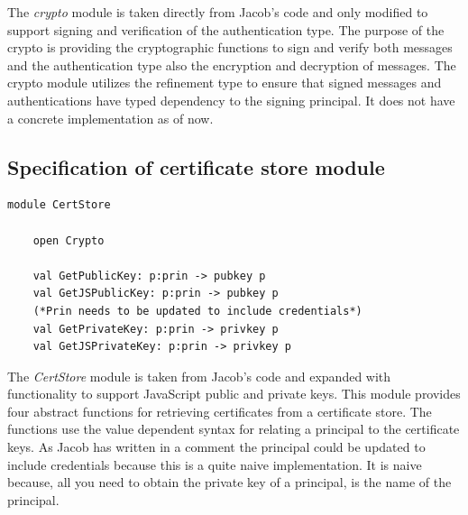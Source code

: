 \documentclass[twosided]{report}
\begin{document}
The \emph{crypto} module is taken directly from Jacob's code and only modified to support signing and verification of the authentication type. The purpose of the crypto is providing the cryptographic functions to sign and verify both messages and the authentication type also the encryption and decryption of messages. The crypto module utilizes the refinement type to ensure that signed messages and authentications have typed dependency to the signing principal. It does not have a concrete implementation as of now.
\subsection{Specification of certificate store module}

\begin{lstlisting}[style=fstar, caption={Abstract certificate store}]
	module CertStore
	
	open Crypto

	val GetPublicKey: p:prin -> pubkey p
	val GetJSPublicKey: p:prin -> pubkey p
	(*Prin needs to be updated to include credentials*)
	val GetPrivateKey: p:prin -> privkey p 
	val GetJSPrivateKey: p:prin -> privkey p
\end{lstlisting}

The \emph{CertStore} module is taken from Jacob's code and expanded with functionality to support JavaScript public and private keys. This module provides four abstract functions for retrieving certificates from a certificate store. The functions use the value dependent syntax for relating a principal to the certificate keys. As Jacob has written in a comment the principal could be updated to include credentials because this is a quite naive implementation. It is naive because, all you need to obtain the private key of a principal, is the name of the principal.

\clearpage
\end{document}

